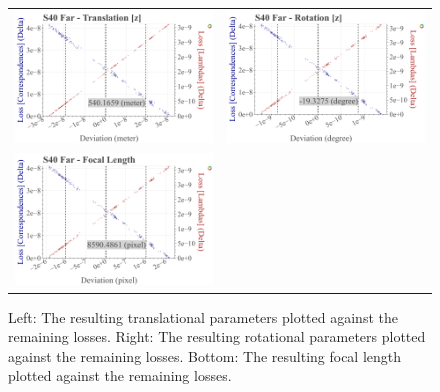 \begin{figure}[!ht]
\begin{tabular}{cc}
    \includegraphics[width=0.45 \linewidth]{diagrams/calibration/s40_n_far/parameters.csv/Translation[z]_vs_Loss[Correspondences]_vs_Loss[Lambdas]_cluster_All.png} &
    \includegraphics[width=0.45 \linewidth]{diagrams/calibration/s40_n_far/parameters.csv/Rotation[z]_vs_Loss[Correspondences]_vs_Loss[Lambdas]_cluster_All.png} \\

    \includegraphics[width=0.45 \linewidth]{diagrams/calibration/s40_n_far/parameters.csv/FocalLength_vs_Loss[Correspondences]_vs_Loss[Lambdas]_cluster_All.png} &
\end{tabular}
\caption{
  Left: The resulting translational parameters plotted against the remaining losses. 
  Right: The resulting rotational parameters plotted against the remaining losses.
  Bottom: The resulting focal length  plotted against the remaining losses.
   }
\label{fig:static_calibration_algorithmic_error_s40_n_far}
\end{figure}

